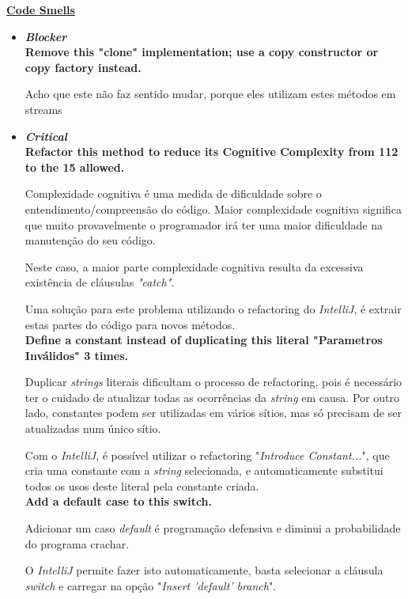 \documentclass[a4paper]{report}
\begin{document}
\underline{\textbf{Code Smells}}
\begin{itemize}
    \item \textit{\textbf{Blocker}}\\
    \textbf{Remove this "clone" implementation; use a copy constructor or copy factory instead.}
    
    Acho que este não faz sentido mudar, porque eles utilizam estes métodos em streams\\
    
    \item \textit{\textbf{Critical}}\\
    \textbf{Refactor this method to reduce its Cognitive Complexity from 112 to the 15 allowed.}
    
    Complexidade cognitiva é uma medida de dificuldade sobre o entendimento/compreensão do código. Maior complexidade cognitiva significa que muito provavelmente o programador irá ter uma maior dificuldade na manutenção do seu código.
    
    Neste caso, a maior parte complexidade cognitiva resulta da excessiva existência de cláusulas \textit{"catch"}.
    
    Uma solução para este problema utilizando o refactoring do \textit{IntelliJ}, é extrair estas partes do código para novos métodos.\\
    
    
    \textbf{Define a constant instead of duplicating this literal "Parametros Inválidos" 3 times.}

    Duplicar \textit{strings} literais dificultam o processo de refactoring, pois é necessário ter o cuidado de atualizar todas as ocorrências da \textit{string} em causa.
    Por outro lado, constantes podem ser utilizadas em vários sítios, mas só precisam de ser atualizadas num único sítio.

    Com o \textit{IntelliJ}, é possível utilizar o refactoring "\textit{Introduce Constant...}", que cria uma constante com a \textit{string} selecionada, e automaticamente substitui todos os usos deste literal pela constante criada.\\

    \textbf{Add a default case to this switch.}

    Adicionar um caso \textit{default} é programação defensiva e diminui a probabilidade do programa crachar.

    O \textit{IntelliJ} permite fazer isto automaticamente, basta selecionar a cláusula \textit{switch} e carregar na opção "\textit{Insert 'default' branch}".\\
    

\end{itemize}
\end{document}
